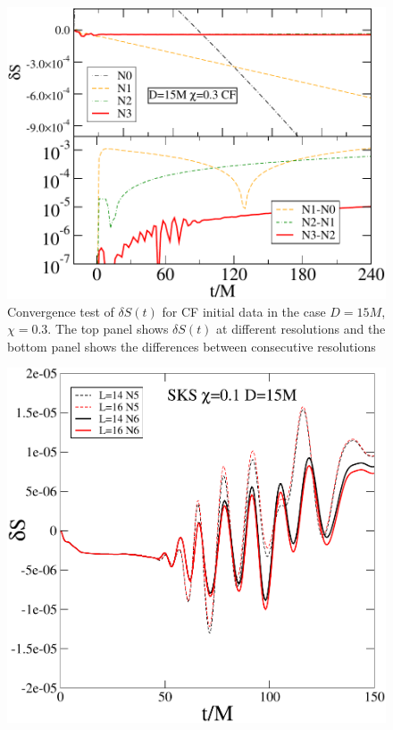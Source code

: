 \documentclass[aps,prd,amsmath,floatfix,twocolumn,superscriptaddress,nofootinbib,showpacs]{revtex4-1}
\theoremstyle{plain}
\theoremstyle{definition}
\begin{document}
\begin{figure}
  \includegraphics[width=0.99\columnwidth]{CFSConvergence1}
  \caption{Convergence test of $\delta S(t)$ for CF initial data in the case
    $D=15M$, $\chi=0.3$. The top panel shows $\delta S(t)$ at different
    resolutions and the bottom panel shows the differences between
    consecutive resolutions}
  \label{fig:CFSConvergence1}
\end{figure}

\begin{figure}
  \includegraphics[width=0.99\columnwidth]{dS_SKS_S1}
\end{figure}
\end{document}

